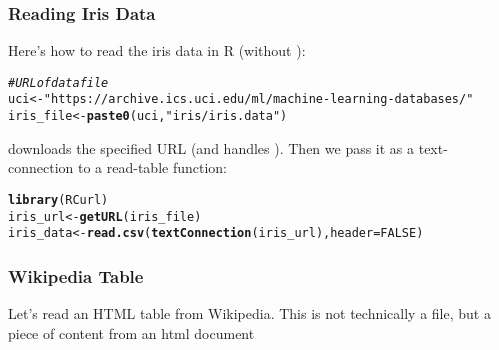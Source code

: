 \documentclass[12pt]{beamer}\usepackage[]{graphicx}\usepackage[]{color}
\makeatletter
\newcommand{\hlnum}[1]{\textcolor[rgb]{0.686,0.059,0.569}{#1}}%
\newcommand{\hlstr}[1]{\textcolor[rgb]{0.192,0.494,0.8}{#1}}%
\newcommand{\hlcom}[1]{\textcolor[rgb]{0.678,0.584,0.686}{\textit{#1}}}%
\newcommand{\hlstd}[1]{\textcolor[rgb]{0.345,0.345,0.345}{#1}}%
\newcommand{\hlkwb}[1]{\textcolor[rgb]{0.69,0.353,0.396}{#1}}%
\newcommand{\hlkwc}[1]{\textcolor[rgb]{0.333,0.667,0.333}{#1}}%
\newcommand{\hlkwd}[1]{\textcolor[rgb]{0.737,0.353,0.396}{\textbf{#1}}}%
\newenvironment{kframe}{%
 \def\at@end@of@kframe{}%
 \ifinner\ifhmode%
  \def\at@end@of@kframe{\end{minipage}}%
  \begin{minipage}{\columnwidth}%
 \fi\fi%
 \def\FrameCommand##1{\hskip\@totalleftmargin \hskip-\fboxsep
 \colorbox{shadecolor}{##1}\hskip-\fboxsep
     \hskip-\linewidth \hskip-\@totalleftmargin \hskip\columnwidth}%
 \MakeFramed {\advance\hsize-\width
   \@totalleftmargin\z@ \linewidth\hsize
   \@setminipage}}%
 {\par\unskip\endMakeFramed%
 \at@end@of@kframe}
\newenvironment{knitrout}{}{} %
\makeatother
\begin{document}
\begin{frame}[fragile]
\frametitle{Reading Iris Data}

Here's how to read the iris data in R (without ):
\begin{knitrout}\scriptsize
{}\color{fgcolor}\begin{kframe}
\begin{alltt}
\hlcom{# URL of data file}
\hlstd{uci} \hlkwb{<-} \hlstr{"https://archive.ics.uci.edu/ml/machine-learning-databases/"}
\hlstd{iris_file} \hlkwb{<-} \hlkwd{paste0}\hlstd{(uci,} \hlstr{"iris/iris.data"}\hlstd{)}
\end{alltt}
\end{kframe}
\end{knitrout}

{\hilit {}} downloads the specified URL (and handles ). Then we pass it as a text-connection to a read-table function:

\begin{knitrout}\footnotesize
{}\color{fgcolor}\begin{kframe}
\begin{alltt}
\hlkwd{library}\hlstd{(RCurl)}
\hlstd{iris_url} \hlkwb{<-} \hlkwd{getURL}\hlstd{(iris_file)}
\hlstd{iris_data} \hlkwb{<-} \hlkwd{read.csv}\hlstd{(}\hlkwd{textConnection}\hlstd{(iris_url),} \hlkwc{header} \hlstd{=} \hlnum{FALSE}\hlstd{)}
\end{alltt}
\end{kframe}
\end{knitrout}

\end{frame}


\begin{frame}[fragile]
\frametitle{Wikipedia Table}

Let's read an HTML table from Wikipedia. This is not technically a file, but a piece of content from an html document
\eb

\begin{center}

\end{center}

\end{frame}
\end{document}
